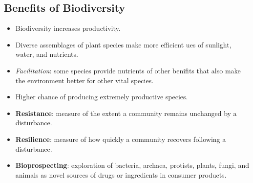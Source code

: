 \documentclass[12pt,a4paper]{article}
\begin{document}
\subsection{Benefits of Biodiversity}
\begin{itemize}
    \item Biodiversity increases productivity. 
    \item Diverse assemblages of plant species make more efficient ues of sunlight, water, and nutrients.
    \item \textit{Facilitation}: some species provide nutrients of other benifits that also make the environment better for other vital species.
    \item Higher chance of producing extremely productive species.
    \item \textbf{Resistance}: measure of the extent a community remains unchanged by a disturbance.
    \item \textbf{Resilience}: measure of how quickly a community recovers following a disturbance. 
    \item \textbf{Bioprospecting}: exploration of bacteria, archaea, protists, plants, fungi, and animals as novel sources of drugs or ingredients in consumer products.
\end{itemize}
\end{document}
